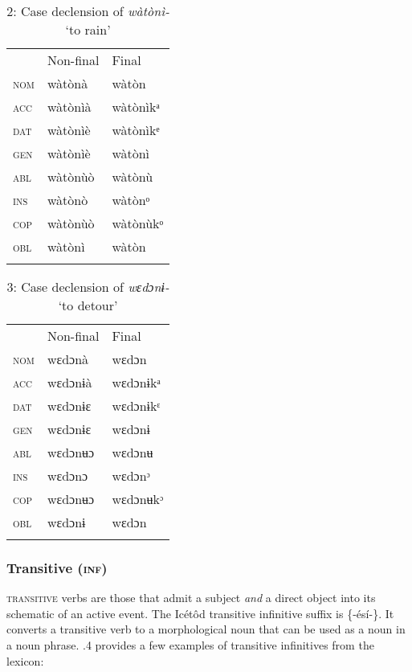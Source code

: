 \begin{table}
\caption{2: Case declension of \textit{wàtònì-} ‘to rain’}
\label{tab:8}


\begin{tabularx}{\textwidth}{XXX} & Non-final & Final\\
\lsptoprule
\textsc{nom} & wàtònà & wàtòn\\
\textsc{acc} & wàtònìà & wàtònìkᵃ\\
\textsc{dat} & wàtònìè & wàtònìkᵉ\\
\textsc{gen} & wàtònìè & wàtònì\\
\textsc{abl} & wàtònùò & wàtònù\\
\textsc{ins} & wàtònò & wàtònᵒ\\
\textsc{cop} & wàtònùò & wàtònùkᵒ\\
\textsc{obl} & wàtònì & wàtòn\\
\lspbottomrule
\end{tabularx}
\end{table}

\begin{table}
\caption{3: Case declension of \textit{wɛdɔnɨ-} ‘to detour’}
\label{tab:8}


\begin{tabularx}{\textwidth}{XXX} & Non-final & Final\\
\lsptoprule
\textsc{nom} & wɛdɔnà & wɛdɔn\\
\textsc{acc} & wɛdɔnɨà & wɛdɔnɨkᵃ\\
\textsc{dat} & wɛdɔnɨɛ & wɛdɔnɨkᵋ\\
\textsc{gen} & wɛdɔnɨɛ & wɛdɔnɨ\\
\textsc{abl} & wɛdɔnʉɔ & wɛdɔnʉ\\
\textsc{ins} & wɛdɔnɔ & wɛdɔnᵓ\\
\textsc{cop} & wɛdɔnʉɔ & wɛdɔnʉkᵓ\\
\textsc{obl} & wɛdɔnɨ & wɛdɔn\\
\lspbottomrule
\end{tabularx}
\end{table}

\subsubsection{Transitive (\textsc{inf})}

\textsc{transitive} verbs are those that admit a subject \textit{and} a direct object into its schematic of an active event. The Icétôd transitive infinitive suffix is \{-ésí-\}. It converts a transitive verb to a morphological noun that can be used as a noun in a noun phrase. .4 provides a few examples of transitive infinitives from the lexicon:


